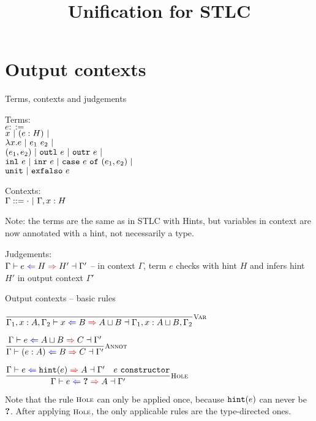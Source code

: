 \documentclass{beamer}
\title{Unification for STLC}
\begin{document}
\frame{\titlepage}

\section{Output contexts}

\begin{frame}{Terms, contexts and judgements}

Terms: \\
$e ::=$ \\
\qquad $x \ |\  (e : H) \ |\  $ \\
\qquad $\lambda x. e \ |\  e_1\ e_2 \ |\ $ \\
\qquad $(e_1, e_2) \ |\  \texttt{outl}\ e \ |\  \texttt{outr}\ e \ |\ $ \\
\qquad $\texttt{inl}\ e \ |\  \texttt{inr}\ e \ |\  \texttt{case}\ e\ \texttt{of}\ (e_1, e_2) \ |\ $ \\
\qquad $\texttt{unit} \ |\  \texttt{exfalso}\ e$

\vspace{1em}

Contexts: \\
$\Gamma ::= \cdot \ |\  \Gamma, x : H$

\vspace{1em}

Note: the terms are the same as in STLC with Hints, but variables in context are now annotated with a hint, not necessarily a type.

\vspace{1em}

Judgements: \\
$\fulloutctx{\Gamma}{e}{H}{H'}{\Gamma'}$ -- in context $\Gamma$, term $e$ checks with hint $H$ and infers hint $H'$ in output context $\Gamma'$

\end{frame}

\begin{frame}{Output contexts -- basic rules}

\begin{center}
  $\infrule[Var]{}{\fulloutctx{\Gamma_1, x : A, \Gamma_2}{x}{B}{\combinehints{A}{B}}{\Gamma_1, x : \combinehints{A}{B}, \Gamma_2}}$

  \vspace{2em}

  $\infrule[Annot]{\outctx{e}{\combinehints{A}{B}}{C}}{\outctx{\annot{e}{A}}{B}{C}}$

  \vspace{2em}

  $\infrule[Hole]{\outctx{e}{\hintfor{e}}{A} \quad \sidecond{e\ \texttt{constructor}}}{\outctx{e}{\Hole}{A}}$
\end{center}

\vspace{2em}

Note that the rule $\textsc{\footnotesize{Hole}}$ can only be applied once, because $\texttt{hint}(e)$ can never be $\textbf{?}$. After applying $\textsc{\footnotesize{Hole}}$, the only applicable rules are the type-directed ones.

\end{frame}
\end{document}
